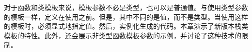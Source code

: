 对于函数和类模板来说，模板参数不必是类型，也可以是普通值。与使用类型参数的模板一样，定义在使用之前。但是，其中不同的是值，而不是类型。当使用这样的模板时，必须显式地指定值。然后，实例化生成的代码。本章演示了新版本栈类模板的特性。此外，还会展示非类型函数模板参数的示例，并讨论了这种技术的限制。